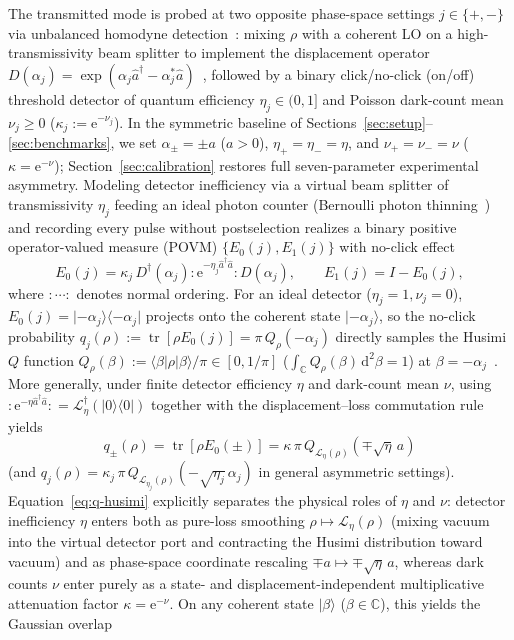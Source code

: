 \documentclass{iopjournal}
\newcommand{\tr}{\operatorname{tr}}
\newcommand{\ket}[1]{\lvert #1\rangle}
\newcommand{\bra}[1]{\langle #1\rvert}
\newcommand{\dd}{\mathrm{d}}
\newcommand{\ee}{\mathrm{e}}
\newcommand{\I}{I}
\newcommand{\calL}{\mathcal{L}}
\begin{document}
The transmitted mode is probed at two opposite phase-space settings $j \in \{+, -\}$ via unbalanced homodyne detection~\cite{ScullyZubairy1997,Sperling2012,Kovtoniuk2024}: mixing $\rho$ with a coherent LO on a high-transmissivity beam splitter to implement the displacement operator $D(\alpha_j) = \exp(\alpha_j\hat a^\dagger - \alpha_j^*\hat a)$~\cite{GerryKnight2005,ScullyZubairy1997}, followed by a binary click/no-click (on/off) threshold detector of quantum efficiency $\eta_j \in (0,1]$ and Poisson dark-count mean $\nu_j \ge 0$ ($\kappa_j := \ee^{-\nu_j}$). In the symmetric baseline of Sections~\ref{sec:setup}--\ref{sec:benchmarks}, we set $\alpha_\pm = \pm a$ ($a > 0$), $\eta_+ = \eta_- = \eta$, and $\nu_+ = \nu_- = \nu$ ($\kappa = \ee^{-\nu}$); Section~\ref{sec:calibration} restores full seven-parameter experimental asymmetry. Modeling detector inefficiency via a virtual beam splitter of transmissivity $\eta_j$ feeding an ideal photon counter (Bernoulli photon thinning~\cite{Loudon2000,ScullyZubairy1997}) and recording every pulse without postselection realizes a binary positive operator-valued measure (POVM) $\{E_0(j), E_1(j)\}$ with no-click effect~\cite{Loudon2000,Sperling2012,Kovtoniuk2024}
\begin{equation}\label{eq:noclick-povm}
E_0(j) = \kappa_j\, D^\dagger(\alpha_j) :\!\ee^{-\eta_j \hat a^\dagger \hat a}\!: D(\alpha_j), \qquad E_1(j) = \I - E_0(j),
\end{equation}
where $:\!\cdots\!:$ denotes normal ordering. For an ideal detector ($\eta_j = 1, \nu_j = 0$), $E_0(j) = \ket{-\alpha_j}\!\bra{-\alpha_j}$ projects onto the coherent state $\ket{-\alpha_j}$, so the no-click probability $q_j(\rho) := \tr[\rho E_0(j)] = \pi\,Q_\rho(-\alpha_j)$ directly samples the Husimi $Q$ function $Q_\rho(\beta) := \bra{\beta}\rho\ket{\beta}/\pi \in [0, 1/\pi]$ ($\int_{\mathbb{C}} Q_\rho(\beta)\,\dd^2\beta = 1$) at $\beta = -\alpha_j$~\cite{ScullyZubairy1997,GerryKnight2005}. More generally, under finite detector efficiency $\eta$ and dark-count mean $\nu$, using $:\!\ee^{-\eta\hat a^\dagger\hat a}\!: = \calL_\eta^\dagger(\ket{0}\!\bra{0})$ together with the displacement--loss commutation rule yields
\begin{equation}\label{eq:q-husimi}
q_\pm(\rho) = \tr[\rho E_0(\pm)] = \kappa\,\pi\,Q_{\calL_\eta(\rho)}(\mp\sqrt{\eta}\,a)
\end{equation}
(and $q_j(\rho) = \kappa_j\,\pi\,Q_{\calL_{\eta_j}(\rho)}(-\sqrt{\eta_j}\,\alpha_j)$ in general asymmetric settings). Equation~\eqref{eq:q-husimi} explicitly separates the physical roles of $\eta$ and $\nu$: detector inefficiency $\eta$ enters both as pure-loss smoothing $\rho \mapsto \calL_\eta(\rho)$ (mixing vacuum into the virtual detector port and contracting the Husimi distribution toward vacuum) and as phase-space coordinate rescaling $\mp a \mapsto \mp\sqrt{\eta}\,a$, whereas dark counts $\nu$ enter purely as a state- and displacement-independent multiplicative attenuation factor $\kappa = \ee^{-\nu}$. On any coherent state $\ket{\beta}$ ($\beta \in \mathbb{C}$), this yields the Gaussian overlap
\end{document}
